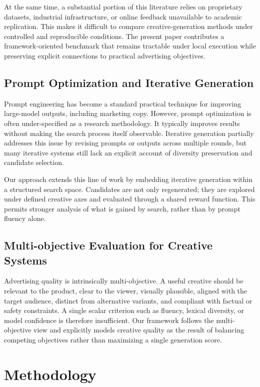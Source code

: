 \documentclass[preprint,12pt]{elsarticle}
\begin{document}
At the same time, a substantial portion of this literature relies on proprietary datasets, industrial infrastructure, or online feedback unavailable to academic replication. This makes it difficult to compare creative-generation methods under controlled and reproducible conditions. The present paper contributes a framework-oriented benchmark that remains tractable under local execution while preserving explicit connections to practical advertising objectives.

\subsection{Prompt Optimization and Iterative Generation}

Prompt engineering has become a standard practical technique for improving large-model outputs, including marketing copy. However, prompt optimization is often under-specified as a research methodology. It typically improves results without making the search process itself observable. Iterative generation partially addresses this issue by revising prompts or outputs across multiple rounds, but many iterative systems still lack an explicit account of diversity preservation and candidate selection.

Our approach extends this line of work by embedding iterative generation within a structured search space. Candidates are not only regenerated; they are explored under defined creative axes and evaluated through a shared reward function. This permits stronger analysis of what is gained by search, rather than by prompt fluency alone.

\subsection{Multi-objective Evaluation for Creative Systems}

Advertising quality is intrinsically multi-objective. A useful creative should be relevant to the product, clear to the viewer, visually plausible, aligned with the target audience, distinct from alternative variants, and compliant with factual or safety constraints. A single scalar criterion such as fluency, lexical diversity, or model confidence is therefore insufficient. Our framework follows the multi-objective view and explicitly models creative quality as the result of balancing competing objectives rather than maximizing a single generation score.

\section{Methodology}
\end{document}

